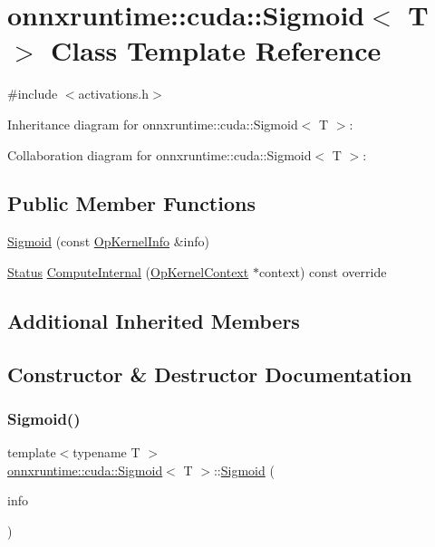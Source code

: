\hypertarget{classonnxruntime_1_1cuda_1_1Sigmoid}{}\section{onnxruntime\+:\+:cuda\+:\+:Sigmoid$<$ T $>$ Class Template Reference}
\label{classonnxruntime_1_1cuda_1_1Sigmoid}


{\ttfamily \#include $<$activations.\+h$>$}



Inheritance diagram for onnxruntime\+:\+:cuda\+:\+:Sigmoid$<$ T $>$\+:


Collaboration diagram for onnxruntime\+:\+:cuda\+:\+:Sigmoid$<$ T $>$\+:
\subsection*{Public Member Functions}
\begin{DoxyCompactItemize}
\item 
\mbox{\hyperlink{classonnxruntime_1_1cuda_1_1Sigmoid_af6176db0433ef36c38a1cbbe03cb1002}{Sigmoid}} (const \mbox{\hyperlink{classonnxruntime_1_1OpKernelInfo}{Op\+Kernel\+Info}} \&info)
\item 
\mbox{\hyperlink{classonnxruntime_1_1common_1_1Status}{Status}} \mbox{\hyperlink{classonnxruntime_1_1cuda_1_1Sigmoid_a0ffe8b56e588d6132241e59515dbdff6}{Compute\+Internal}} (\mbox{\hyperlink{classonnxruntime_1_1OpKernelContext}{Op\+Kernel\+Context}} $\ast$context) const override
\end{DoxyCompactItemize}
\subsection*{Additional Inherited Members}


\subsection{Constructor \& Destructor Documentation}
\mbox{\label{classonnxruntime_1_1cuda_1_1Sigmoid_af6176db0433ef36c38a1cbbe03cb1002}} 
\subsubsection{\texorpdfstring{Sigmoid()}{Sigmoid()}}
{\footnotesize\ttfamily template$<$typename T $>$ \\
\mbox{\hyperlink{classonnxruntime_1_1cuda_1_1Sigmoid}{onnxruntime\+::cuda\+::\+Sigmoid}}$<$ T $>$\+::\mbox{\hyperlink{classonnxruntime_1_1cuda_1_1Sigmoid}{Sigmoid}} (\begin{DoxyParamCaption}\item[{const \mbox{\hyperlink{classonnxruntime_1_1OpKernelInfo}{Op\+Kernel\+Info}} \&}]{info }\end{DoxyParamCaption})\hspace{0.3cm}{\ttfamily [inline]}}



